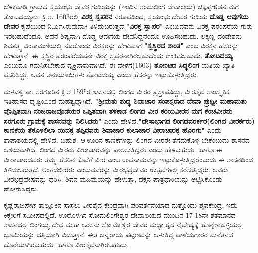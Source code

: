 ಬೆಳಕವಾಡಿ ಗ್ರಾಮದ ಸ್ವಯಂಭು ದೇವರ ಗುಡಿಯನ್ನು (ಇಂದಿನ ಶಂಭುಲಿಂಗ ದೇವಾಲಯ) ಚಿಕ್ಕಪ್ಪಗೌಡನ ಮಗ ತೋಟದಯ್ಯನು, ಕ್ರಿ.ಶ. 1603ರಲ್ಲಿ \textbf{ವಿರಕ್ತ ಸ್ವಪರನ} ನಿರೂಪದಿಂದ, ಸ್ವಯಂಭು ದೇವರ ಗುಡಿಯ \textbf{ದೊಡ್ಡ ಆವುಗೆಯ ದೇವರ} ಕೃಪೆಯಿಂದ ನಿರ್ಮಿಸಿರುವುದಾಗಿ ತಿಳಿದುಬರುತ್ತದೆ.\textbf{"ವಿರಕ್ತ ಸ್ವಾಪರ"} ಎಂಬುವವನು ವಿರಕ್ತ ಪರಂಪರೆಯ ಗುರು ಇರಬಹುದೆಂದೂ, ಅವನ ಶಿಷ್ಯನಾಗಿ ದೊಡ್ಡ ಆವುಗೆಯ ದೇವನಿದ್ದನೆಂದೂ ಊಹಿಸಬಹುದು. ಲಕ್ಕಣ್ಣ ದಂಡೇಶನು ಶಿವತತ್ತ್ವ ಚಿಂತಾಮಣಿಯಲ್ಲಿ ನೂರೊಂದು ವಿರಕ್ತರನ್ನು ಹೇಳುವಾಗ \textbf{"ಸ್ವಸ್ಥಿರದ ಶಾಂತ"} ಎಂಬ ವಿರಕ್ತನ ಹೆಸರನ್ನು ಹೇಳುತ್ತಾನೆ. ಈ ಸ್ವಸ್ಥಿರ ಪರಂಪರೆಯವನೇ ವಿರಕ್ತ ಸ್ವಪರನಾಗಿರಬಹುದೆಂದು ಊಹಿಸಬಹುದು. \textbf{ತೋಟದಯ್ಯ }ಎಂಬುದೂ ಗಮನಿಸ\break ಬೇಕಾದ ವ್ಯಕ್ತಿನಾಮವಾಗಿದೆ. ಈ ವೇಳೆಗೆ(1603) \textbf{ತೋಂಟದ ಸಿದ್ಧಲಿಂಗ} ಯತಿಯ ಖ್ಯಾತಿ ಪಸರಿಸಿದ್ದು, ಅವನ ಅನುಯಾಯಿ\-ಗಳು ತೋಟದಯ್ಯ ಎಂದು ಹೆಸರನ್ನು ಇಟ್ಟುಕೊಳ್ಳುತ್ತಿದ್ದರು.

ಮಳವಳ್ಳಿ ತಾ. ಸರಗೂರಿನ ಕ್ರಿ.ಶ 1595ರ ಶಾಸನದಲ್ಲಿ ಲಿಂಗದ ವೀರರ ಪ್ರಸ್ತಾಪವಿದ್ದು, ವೀರಶೈವ ಸಾಂಸ್ಕೃತಿಕ ಇತಿಹಾಸದ ದೃಷ್ಟಿಯಿಂದ ಮಹತ್ವದ್ದಾಗಿದೆ. \textbf{"ಶ‍್ರೀಮತು ಶುದ್ಧ ಶಿವಾಚಾರ ಸಂಪನ್ನರಾದ ದೇವಾ ಪ್ರುಥ್ವೀ ಮಹಾಮತು ವೊಪ್ಪಿತವಾಗಿ ನಂಜರಾಜವೊಡೆಯರ ಒಪ್ಪಿತವಾಗಿ ತಳಕಾಡ ಲಿಂಗದ ವೀರ ಕರಿಯವೀರನ ಮಗ ಕೆಂಚವೀರನು ಸರಗೂರು ಗ್ರಾಮಕ್ಕೆ ಶಾಸನವನ್ನು ನಿಲಿಸಿದನು"} ಎಂದು ಹೇಳಿದೆ.\textbf{"ದೇಸಾಭಾಗದ ಲಿಂಗದವರರ್ಕರ(ಲಿಂಗದ ವೀರರ್ಕರು) ಕಾಣಿಕೆಯ ತೆಕೊಳಲಿಲಾ ಯಿದಕ್ಕೆ ತಪ್ಪಿದವರು ಶಿವಾಚಾರ ಕುಲಾಚಾರ ವೀರಾಚಾರಕ್ಕೆ ಹೊರಗು"} ಎಂದು ಶಾಪಾಶಯದಲ್ಲಿ ಹೇಳಿದೆ. ಬಹುಶ: ಆ ಊರಿನ ಕಾಣಿಕೆಗಳನ್ನು ಲಿಂಗದ ವೀರರೇ ತೆಗೆದುಕೊಳ್ಳ ಬೇಕೆಂಬುದು ಶಾಸನದ ಆಶಯವಾಗಿದೆ. ಲಿಂಗದ ವೀರರು ವೀರಾಚಾರವನ್ನು ಪಾಲಿಸುತ್ತಿದ್ದರು ಎಂದು ಹೇಳಬಹುದು. ಹಾಗೂ ಈ ವೀರಾಚಾರದವರು ತಮ್ಮ ಹೆಸರಿನ ಕೊನೆಗೆ ವೀರ ಎಂಬ ಉಪನಾಮವನ್ನು ಇಟ್ಟುಕೊಳ್ಳುತ್ತಿದ್ದರೆಂಬುದು ಈ ಶಾಸನದಿಂದ ತಿಳಿದುಬರುತ್ತದೆ. ಲಿಂಗದಬೀರರು ಎಂಬುವವರನ್ನು ವೀರಭದ್ರದೇವರ ಉತ್ಸವಗಳಲ್ಲಿ ಕರೆಸುತ್ತಿದ್ದರು. ಅವರು ವೀರಭದ್ರವೇಷವನ್ನು ಧರಿಸಿ, ಶಿವನ ಮಹಿಮೆಯನ್ನು ಹೇಳುತ್ತಾ, ದಕ್ಷನ ಪಾತ್ರಧಾರಿಯನ್ನು ಅಟ್ಟಿಸಿಕೊಂಡು ಹೋಗುತ್ತಿದ್ದರು.

ಕೃಷ್ಣರಾಜಪೇಟೆ ತಾಲ್ಲೂಕಿನ ಸಾಸಲು ವೀರಶೈವ ಕೇಂದ್ರವಾಗಿ ಪರಿವರ್ತನೆಯಾದ ಮತ್ತೊಂದು ಶೈವಕೇಂದ್ರ. ಇದು ಕಿಕ್ಕೇರಿಗೆ ಸಮೀಪದಲ್ಲಿದೆ. ಊರೊಳಗಿನ ಸೋಮಲಿಂಗೇಶ್ವರ ದೇವಾಲಯದ ಮುಂದಿನ 17-18ನೇ ಶತಮಾನದ ಶಾಸನದಲ್ಲಿ ಲಿಂಗಯ್ಯ ದೇವ ಮಹಾ ಅರಸನು ಸೋಮೇಶ್ವರ ದೇವರ ಮಧ್ಯಾಹ್ನದ ನೈವೇದ್ಯಕ್ಕೆ ಹೊನ್ನೇನಹಳ್ಳಿಯಲ್ಲಿ ಭೂಮಿಯನ್ನು ದತ್ತಿಯಾಗಿ ಬಿಡುತ್ತಾನೆ. ಈತ ಚನ್ನರಾಯ ಪಟ್ಟಣವನ್ನು ಆಳುತ್ತಿದ್ದ ಪಾಳೆಯಗಾರರ ಮನೆತನದ ದೊರೆಯಾಗಿರಬಹುದು. ಹಾಗೂ ವೀರಶೈವನಾಗಿರಬಹುದು.

